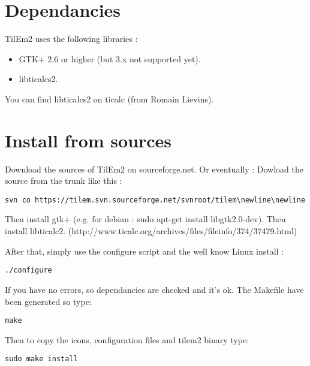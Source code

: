 \documentclass[10pt]{report}
\begin{document}
\section{Dependancies}
TilEm2 uses the following libraries :\newline
\begin{itemize}
\item	GTK+ 2.6 or higher (but 3.x not supported yet).
\item	libticalcs2.
\end{itemize}
You can find libticalcs2 on ticalc (from Romain Lievins).\newline

\section{Install from sources}
Download the sources of TilEm2 on sourceforge.net.\newline
Or eventually :\newline
Dowload the source from the trunk like this :\newline
\begin{lstlisting}
svn co https://tilem.svn.sourceforge.net/svnroot/tilem\newline\newline
\end{lstlisting}

Then install gtk+ (e.g. for debian : sudo apt-get install libgtk2.0-dev).\newline
Then install libticalc2.\newline\newline
(http://www.ticalc.org/archives/files/fileinfo/374/37479.html)\newline\newline

After that, simply use the configure script and the well know Linux install :\newline
\begin{lstlisting}
./configure
\end{lstlisting}
If you have no errors, so dependancies are checked and it's ok.\newline
The Makefile have been generated so type:\newline
\begin{lstlisting}
make
\end{lstlisting}
Then to copy the icons, configuration files and tilem2 binary type:\newline
\begin{lstlisting}
sudo make install
\end{lstlisting}
\end{document}

